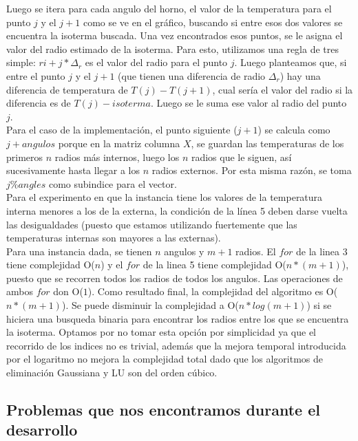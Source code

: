 Luego se itera para cada angulo del horno, el valor de la temperatura para el punto $j$ y el $j+1$ como se ve en el gráfico, buscando si entre esos dos valores se encuentra la isoterma buscada. Una vez encontrados esos puntos, se le asigna el valor del radio estimado de la isoterma. Para esto, utilizamos una regla de tres simple: $ri + j *\Delta_r $ es el valor del radio para el punto $j$. Luego planteamos que, si entre el punto $j$ y el $j+1$ (que tienen una diferencia de radio $\Delta_r$) hay una diferencia de temperatura de $T(j) - T(j+1)$, cual sería el valor del radio si la diferencia es de $T(j) - isoterma$. Luego se le suma ese valor al radio del punto $j$.\\
Para el caso de la implementación, el punto siguiente ($j+1$) se calcula como $j+angulos$ porque en la matriz columna $X$, se guardan las temperaturas de los primeros $n$ radios más internos, luego los $n$ radios que le siguen, así sucesivamente hasta llegar a los $n$ radios externos. Por esta misma razón, se toma $j \% angles$ como subindice para el vector.\\
Para el experimento en que la instancia tiene los valores de la temperatura interna menores a los de la externa, la condición de la línea 5 deben darse vuelta las desigualdades (puesto que estamos utilizando fuertemente que las temperaturas internas son mayores a las externas).\\

Para una instancia dada, se tienen $n$ angulos y $m+1$ radios. El $for$ de la linea 3 tiene complejidad O($n$) y el $for$ de la linea 5 tiene complejidad O($n*(m+1)$), puesto que se recorren todos los radios de todos los angulos. Las operaciones de ambos $for$ don O($1$). Como resultado final, la complejidad del algoritmo es O($n*(m+1)$). Se puede disminuir la complejidad a O($n*log(m+1)$) si se hiciera una busqueda binaria para encontrar los radios entre los que se encuentra la isoterma. Optamos por no tomar esta opción por simplicidad ya que el recorrido de los indices no es trivial, además que la mejora temporal introducida por el logaritmo no mejora la complejidad total dado que los algoritmos de eliminación Gaussiana y LU son del orden cúbico.





\subsection{Problemas que nos encontramos durante el desarrollo}

